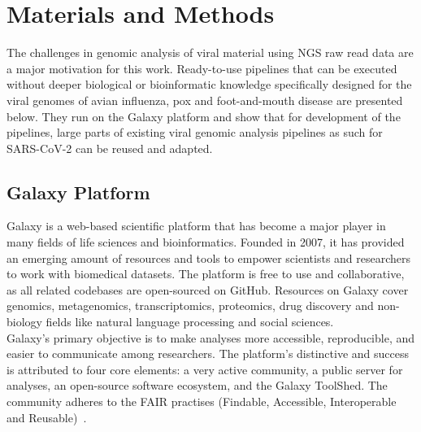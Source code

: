 \chapter{Materials and Methods}\label{chap:methods}
The challenges in genomic analysis of viral material using \ac{NGS} raw read data are a major motivation for this work. Ready-to-use pipelines that can be executed without deeper biological or bioinformatic knowledge specifically designed for the viral genomes of avian influenza, pox and foot-and-mouth disease are presented below. They run on the Galaxy platform and show that for development of the pipelines, large parts of existing viral genomic analysis pipelines as such for SARS-CoV-2 can be reused and adapted.

\section{Galaxy Platform}\label{sec:galaxy}
Galaxy is a web-based scientific platform that has become a major player in many fields of life sciences and bioinformatics. Founded in 2007, it has provided an emerging amount of resources and tools to empower scientists and researchers to work with biomedical datasets. The platform is free to use and collaborative, as all related codebases are open-sourced on GitHub. Resources on Galaxy cover genomics, metagenomics, transcriptomics, proteomics, drug discovery and non-biology fields like natural language processing and social sciences.\\
Galaxy's primary objective is to make analyses more accessible, reproducible, and easier to communicate among researchers. The platform's distinctive and success is attributed to four core elements: a very active community, a public server for analyses, an open-source software ecosystem, and the Galaxy ToolShed. The community adheres to the FAIR practises (Findable, Accessible, Interoperable and Reusable)~\cite{10.1093/nar/gkac247}.

